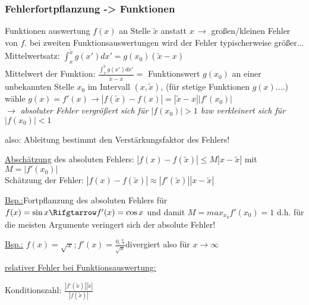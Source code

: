   \subsubsection{Fehlerfortpflanzung -> Funktionen}
  Funktionen auswertung $f(x)$ an Stelle $\tilde{x}$ anstatt $x\, \rightarrow $ großen/kleinen Fehler von $f$.
  bei zweiten Funktionsauswertungen wird der Fehler typischerweise größer...\\
  Mittelwertsatz: $\int_x^{\tilde{x}}g\left(x'\right) dx' = g(x_0)(\tilde{x} - x)$ \\
  Mittelwert der Funktion: $ \frac{\int_x^{\tilde{x}}g\left(x'\right) dx'}{\tilde{x} - x} = $ Funktionswert $g(x_0)$
  an einer unbekannten Stelle $x_0$ im Intervall $(x, \tilde{x})$, (für stetige Funktionen $g(x)$....)\\

  wähle $g(x) = f'(x) \rightarrow \left|f(\tilde{x}) -f(x)\right| = \left|\tilde{x} -x \right| \left|f'(x_0) \right|$ \\
  $\rightarrow$ \textit{absoluter Fehler vergrößert sich für $\left|f(x_0)\right| > 1$ bzw verkleinert sich für $\left|f(x_0)\right| < 1$}

  also: Ableitung bestimmt den Verstärkungsfaktor des Fehlers!

  \underline{Abschätzung} des absoluten Fehlers: $\left|f(x) - f(\tilde{x})\right| \leq M \left|x - \tilde{x}\right|$
  mit $M = \left| f'(x_0) \right|$ \\
  Schätzung der Fehler: $\left|f(x) - f(\tilde{x}) \right| \approx \left|f'(\tilde{x})\right|\left|x - \tilde{x}\right|$

  \underline{Bsp.:}Fortpflanzung des absoluten Fehlers für $f(x) = \sin{x} \Rifgtarrow f'(x) = \cos{x}$ und damit
  $M = max_{x_0} f'(x_0) = 1$ d.h. für die meisten Argumente veringert sich der absolute Fehler! 

  \underline{Bsp.:} $f(x) = \sqrt{x} ; f'(x) = \frac{0,5}{\sqrt{x}}$divergiert also für $x \rightarrow \infty$

  \underline{relativer Fehler bei Funktionsauswertung: }%

  Konditionszahl: $\frac{\left|f'(\tilde{x})\right|\left|\tilde{x}\right|}{\left|f(\tilde{x})\right|}$

